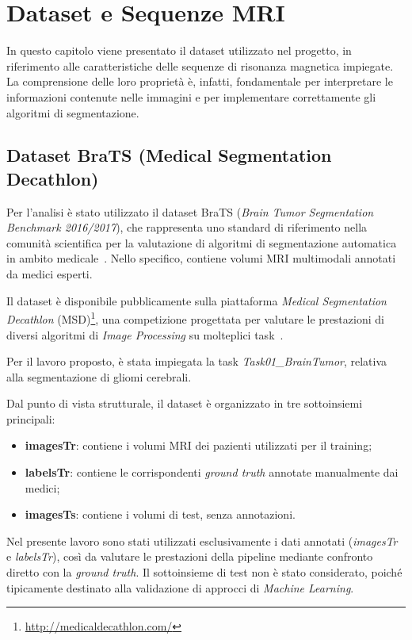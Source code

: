 \chapter{Dataset e Sequenze MRI}
In questo capitolo viene presentato il dataset utilizzato nel progetto, in riferimento alle caratteristiche delle sequenze di risonanza magnetica impiegate.
La comprensione delle loro proprietà è, infatti, fondamentale per interpretare le informazioni contenute nelle immagini e per implementare correttamente gli algoritmi di segmentazione.

\section{Dataset BraTS (Medical Segmentation Decathlon)}
Per l'analisi è stato utilizzato il dataset BraTS (\textit{Brain Tumor Segmentation Benchmark 2016/2017}), che rappresenta uno standard di riferimento nella comunità scientifica per la valutazione di algoritmi di segmentazione automatica in ambito medicale~\cite{menze2015}. Nello specifico, contiene volumi MRI multimodali annotati da medici esperti.

Il dataset è disponibile pubblicamente sulla piattaforma \textit{Medical Segmentation Decathlon} (MSD)\footnote{\url{http://medicaldecathlon.com/}}, una competizione progettata per valutare le prestazioni di diversi algoritmi di \textit{Image Processing} su molteplici task~\cite{antonelli_medical_2022}.

Per il lavoro proposto, è stata impiegata la task \textit{Task01\_BrainTumor}, relativa alla segmentazione di gliomi cerebrali.

Dal punto di vista strutturale, il dataset è organizzato in tre sottoinsiemi principali:
\begin{itemize}
    \item \textbf{imagesTr}: contiene i volumi MRI dei pazienti utilizzati per il training;
    \item \textbf{labelsTr}: contiene le corrispondenti \textit{ground truth} annotate manualmente dai medici;
    \item \textbf{imagesTs}: contiene i volumi di test, senza annotazioni.
\end{itemize}

Nel presente lavoro sono stati utilizzati esclusivamente i dati annotati (\textit{imagesTr} e \textit{labelsTr}), così da valutare le prestazioni della pipeline mediante confronto diretto con la \textit{ground truth}. Il sottoinsieme di test non è stato considerato, poiché tipicamente destinato alla validazione di approcci di \textit{Machine Learning}.

